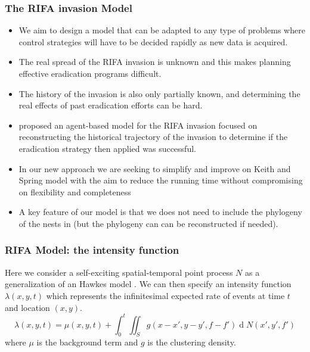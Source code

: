 \documentclass[9pt, xcolor={dvipsnames,svgnames,table}]{beamer}
\renewcommand{\d}[1]{\ensuremath{\operatorname{d}\!{#1}}}
\begin{document}
\begin{frame}
    \frametitle{The RIFA invasion Model}
    \begin{itemize}
        \item We aim to design a \textcolor{PineGreen}{model that can be adapted to any type of problems where control strategies will have to be decided rapidly as new data is acquired}.
        \item  \textcolor{PineGreen}{The real spread of the RIFA invasion is unknown} and this makes planning effective eradication programs difficult.
        \item \textcolor{PineGreen}{The history of the invasion is also only partially known}, and determining the real effects of past eradication efforts can be hard.
        \item \cite{Keith} proposed an agent-based model for the RIFA invasion focused on reconstructing the historical trajectory of the invasion to determine if the eradication strategy then applied was successful.
        \item In our new approach we are seeking to \textcolor{PineGreen}{simplify and improve on Keith and Spring model} with the aim to reduce the running time without compromising on flexibility and completeness
        \item A key feature of our model is that \textcolor{PineGreen}{we does not need to include the phylogeny of the nests in} (but the phylogeny can can be reconstructed if needed).
    \end{itemize}
\end{frame}





\begin{frame}
    \frametitle{RIFA Model: the intensity function}
    Here we consider a self-exciting spatial-temporal point process $N$ as a generalization of an Hawkes model \cite{Hawkes71}. We can then specify an intensity function $\lambda(x, y, t)$ which represents the infinitesimal expected  rate of events at time $t$ and location $(x, y)$.
    \begin{equation*}
        \lambda(x, y, t) = \mu(x, y, t) + \int_{0}^{t} \iint_{S} g(x - x', y - y', f - f') \d N(x', y', f')
    \end{equation*}
    where $\mu$ is the background term and $g$ is the clustering density.
\end{frame}
\end{document}
